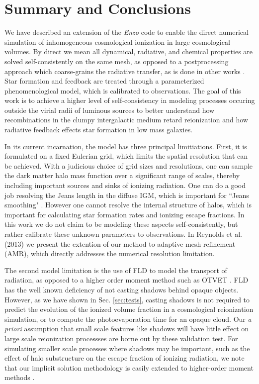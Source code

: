 
\section{Summary and Conclusions}
\label{sec:conclusions}

We have described an extension of the {\em Enzo} code to enable the direct numerical simulation 
of inhomogeneous cosmological ionization in large cosmological volumes. By direct we mean
all dynamical, radiative, and chemical properties are solved self-consistently on the same mesh, 
as opposed to a postprocessing approach which coarse-grains the radiative transfer, as is done
in other works \citep{Iliev06,Zahn07,TracCen2007,TracCenLoeb2008,ShinTracCen2008,Finlator09}. 
Star formation and feedback are treated through a parameterized
phenomenological model, which is calibrated to observations. The goal of this work is to achieve a higher
level of self-consistency in modeling processes occuring outside the virial radii of luminous sources to  
better understand how recombinations in the clumpy intergalactic medium retard reionization and how
radiative feedback effects star formation in low mass galaxies. 

In its current incarnation, the model has three principal limitiations. First, it is formulated on a fixed
Eulerian grid, which limits the spatial resolution that can be achieved. With a judicious choice of grid
sizes and resolutions, one can sample the dark matter halo mass function over a significant range of scales,
thereby including important sources and sinks of ionizing radiation. One can do a good job resolving the Jeans length 
in the diffuse IGM, which is important for ``Jeans smoothing" \citep{Gnedin00b}. However one cannot resolve the
internal structure of halos, which is important for calculating star formation rates and ionizing escape fractions. 
In this work we do not claim to be modeling these aspects self-consistently, but rather calibrate these unknown
parameters to observations. In Reynolds et al. (2013) we present the extention of our method to adaptive
mesh refinement (AMR), which directly addresses the numerical resolution limitation. 

The second model limitation is the use of FLD to model the transport of radiation, as opposed to a higher
order moment method such as OTVET \citep{GnedinAbel2001,Petkova09}. FLD has the well known deficiency of
not casting shadows behind opaque objects. However, as we have shown in Sec. \ref{sec:tests}, casting
shadows is not required to predict the evolution of the ionized volume fraction in a cosmological reionization
simulation, or to compute the photoevaporation time for an opaque cloud. Our {\em a priori} assumption that
small scale features like shadows will have little effect on large scale reionization processses are borne out
by these validation test. For simulating smaller scale processes where shadows may be important, such as the 
effect of halo substructure on the escape fraction of ionizing radiation, we note that our implicit
solution methodology is easily 
extended to higher-order moment methods \citep{HayesNorman2003,Petkova09}. 

